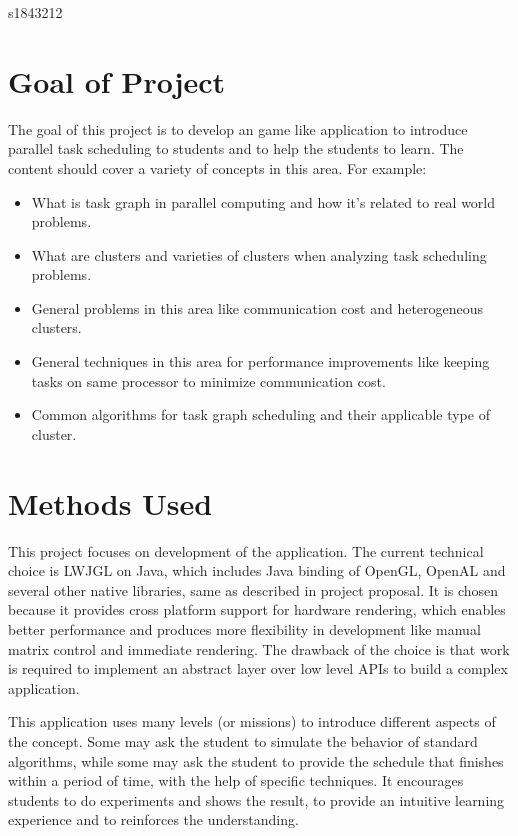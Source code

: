 \documentclass[11pt]{article}
\def\studentNumber{s1843212}
\begin{document}
 


\centerline{\studentNumber}
\vskip 7mm


\section{Goal of Project}

The goal of this project is to develop an game like application to introduce parallel task scheduling to students and to help the students to learn. The content should cover a variety of concepts in this area. For example:

\begin{itemize}
    \item What is task graph in parallel computing and how it's related to real world problems.
    \item What are clusters and varieties of clusters when analyzing task scheduling problems.
    \item General problems in this area like communication cost and heterogeneous clusters.
    \item General techniques in this area for performance improvements like keeping tasks on same processor to minimize communication cost.
    \item Common algorithms for task graph scheduling and their applicable type of cluster.
\end{itemize}

\section{Methods Used}

This project focuses on development of the application. The current technical choice is LWJGL on Java, which includes Java binding of OpenGL, OpenAL and several other native libraries, same as described in project proposal. It is chosen because it provides cross platform support for hardware rendering, which enables better performance and produces more flexibility in development like manual matrix control and immediate rendering. The drawback of the choice is that work is required to implement an abstract layer over low level APIs to build a complex application.

This application uses many levels (or missions) to introduce different aspects of the concept. Some may ask the student to simulate the behavior of standard algorithms, while some may ask the student to provide the schedule that finishes within a period of time, with the help of specific techniques. It encourages students to do experiments and shows the result, to provide an intuitive learning experience and to reinforces the understanding.
\end{document}
